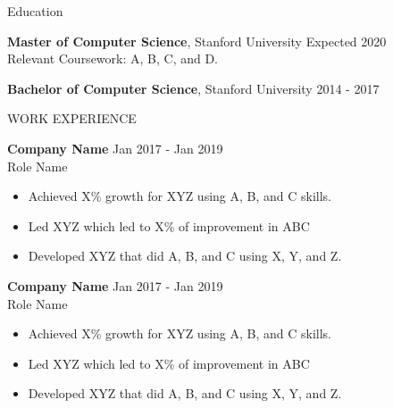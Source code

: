 \documentclass[UTF8]{resume} %
\begin{document}


\begin{rSection}{\textcolor{TITLEBLUE}{Education}}

{\bf Master of Computer Science}, Stanford University \hfill {Expected 2020}\\
Relevant Coursework: A, B, C, and D.

{\bf Bachelor of Computer Science}, Stanford University \hfill {2014 - 2017}


\end{rSection}



\begin{rSection}{\textcolor{TITLEBLUE}{WORK EXPERIENCE}}

\textbf{Company Name} \hfill Jan 2017 - Jan 2019\\
Role Name \hfill 
 \begin{itemize}
    \itemsep -3pt {} 
     \item Achieved X\% growth for XYZ using A, B, and C skills.
     \item Led XYZ which led to X\% of improvement in ABC
    \item Developed XYZ that did A, B, and C using X, Y, and Z. 
 \end{itemize}
 
\textbf{Company Name} \hfill Jan 2017 - Jan 2019\\
Role Name \hfill
 \begin{itemize}
    \itemsep -3pt {} 
     \item Achieved X\% growth for XYZ using A, B, and C skills.
     \item Led XYZ which led to X\% of improvement in ABC
    \item Developed XYZ that did A, B, and C using X, Y, and Z. 
 \end{itemize}

\end{rSection} 
\end{document}
